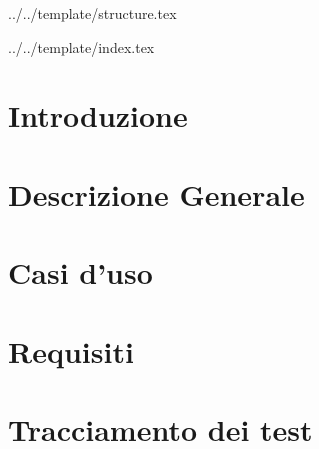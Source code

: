 

\def\DOCUMENTO{Analisi dei Requisiti}
\def\VERSIONE{4.0.0}

\def\DESCRIZIONE{Documento che descrive l'analisi dei requisiti e dei casi d'uso del gruppo \GRUPPO\ per il progetto \PROGETTO.}

\def\REDATTORE {Crespan Emanuele}
\def\VERIFICATORE {Agostinetto Matteo}
\def\RESPONSABILE {Suierica Bogdan}

\def\USO {Esterno}

\def\DISTRIBUZIONE {\GRUPPO{}\\ & \COMMITTENTE{}\\ & \PROPONENTE{}\\}

\def\DESCRIZIONE {Documento che descrive l'analisi dei requisiti e dei casi d'uso del gruppo \GRUPPO{} per il progetto \PROGETTO.}


\def\INDICE	{true}
\def\TABELLE {true}
\def\FIGURE {true}


 {../../template/structure.tex}



 {../../template/index.tex}


\section{Introduzione}

\newpage

\section{Descrizione Generale}

\newpage

\section{Casi d'uso}

\newpage

\section{Requisiti}

\newpage


\section{Tracciamento dei test}

\newpage



